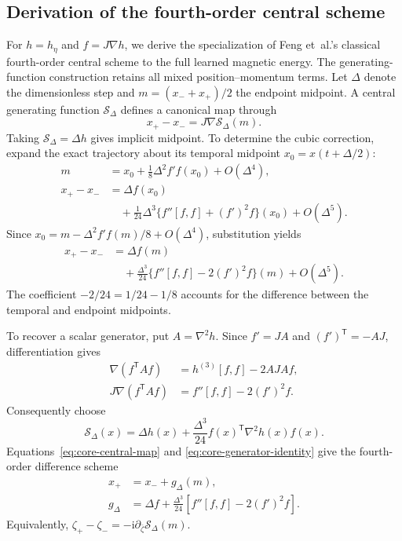 \subsection{Derivation of the fourth-order central scheme}
\label{sec:core-central-derivation}
For $h=h_\eta$ and $f=J\nabla h$, we derive the specialization of
Feng et~al.'s classical fourth-order central scheme
\citep[Theorem~24, p.~90; fourth-order formula, p.~95]{feng} to the
full learned magnetic energy.
The generating-function construction \citep{hairer} retains all mixed
position--momentum terms. Let $\Delta$ denote the dimensionless step and
$m=(x_-+x_+)/2$ the endpoint midpoint. A central generating function
$\mathcal S_\Delta$ defines a canonical map through
\begin{equation}
 x_+-x_-=J\nabla\mathcal S_\Delta(m).
 \label{eq:core-central-map}
\end{equation}
Taking $\mathcal S_\Delta=\Delta h$ gives implicit midpoint. To determine
the cubic correction, expand the exact trajectory about its temporal
midpoint $x_0=x(t+\Delta/2)$:
\begin{align}
 m&=x_0+\tfrac18\Delta^2 f'f(x_0)+O(\Delta^4),\nonumber\\
 x_+-x_-&=\Delta f(x_0)\nonumber\\
 &\quad+\tfrac1{24}\Delta^3\{f''[f,f]+(f')^2f\}(x_0)
  +O(\Delta^5).
 \label{eq:core-midpoint-expansion}
\end{align}
Since $x_0=m-\Delta^2 f'f(m)/8+O(\Delta^4)$, substitution yields
\begin{align}
 x_+-x_-&=\Delta f(m)\nonumber\\
 &\quad+\frac{\Delta^3}{24}
       \{f''[f,f]-2(f')^2f\}(m)+O(\Delta^5).
 \label{eq:core-exact-displacement}
\end{align}
The coefficient $-2/24=1/24-1/8$ accounts for the difference between
the temporal and endpoint midpoints.

To recover a scalar generator, put $A=\nabla^2h$. Since
$f'=JA$ and $(f')^{\mathsf T}=-AJ$, differentiation gives
\begin{align}
 \nabla(f^{\mathsf T}Af)
   &=h^{(3)}[f,f]-2AJA f,\nonumber\\
 J\nabla(f^{\mathsf T}Af)
   &=f''[f,f]-2(f')^2f.
 \label{eq:core-generator-identity}
\end{align}
Consequently choose
\begin{equation}
 \mathcal S_\Delta(x)=\Delta h(x)
             +\frac{\Delta^3}{24}f(x)^{\mathsf T}\nabla^2h(x)f(x).
 \label{eq:core-central-generator}
\end{equation}
Equations~\eqref{eq:core-central-map} and
\eqref{eq:core-generator-identity} give the fourth-order difference scheme
\begin{align}
 x_+&=x_-+g_\Delta(m),\nonumber\\
 g_\Delta&=\Delta f+\frac{\Delta^3}{24}
                 [f''[f,f]-2(f')^2f].
 \label{eq:central4}
\end{align}
Equivalently,
$\zeta_+-\zeta_-=-\mathrm i\partial_{\bar\zeta}\mathcal S_\Delta(m)$.

